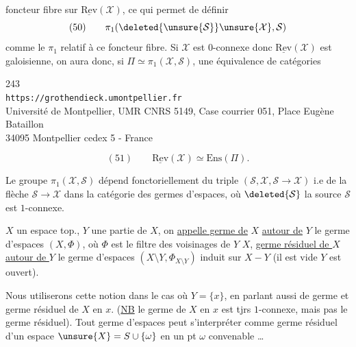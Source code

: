 foncteur fibre sur $\underline{\mathrm{Rev}}(\mathcal X)$, ce qui permet de définir
\[
(50)\qquad \pi_1(\deleted{\unsure{\mathcal S}}\unsure{\mathcal X},\mathcal S)
\]
comme le $\pi_1$ relatif à ce foncteur fibre. Si $\mathcal X$ est $0$-connexe donc $\underline{\mathrm{Rev}}(\mathcal X)$ est galoisienne, on aura donc, si $\Pi\simeq\pi_1(\mathcal X,\mathcal S)$, une équivalence de catégories


\begin{center}
243\\
\texttt{https://grothendieck.umontpellier.fr}\\
Université de Montpellier, UMR CNRS 5149, Case courrier 051, Place Eugène Bataillon\\
34095 Montpellier cedex 5 - France
\end{center}


\[
(51)\qquad \underline{\mathrm{Rev}}(\mathcal X)\simeq\mathrm{Ens}(\Pi).
\]

Le groupe $\pi_1(\mathcal X,\mathcal S)$ dépend fonctoriellement du triple $(\mathcal S,\mathcal X,\mathcal S\longrightarrow\mathcal X)$ i.e de la flèche $\mathcal S\longrightarrow\mathcal X$ dans la catégorie des germes d'espaces, où $\deleted{\mathcal S}$ la source $\mathcal S$ est $1$-connexe.

 $X$ un espace top., $Y$ une partie de $X$, on \uline{appelle germe de} $X$ \uline{autour de} $Y$ le germe d'espaces $(X,\Phi)$, où $\Phi$ est le filtre des voisinages de $Y$  $X$, \uline{germe résiduel de $X$ autour de $Y$} le germe d'espaces $(X\setminus Y,\Phi_{X\setminus Y})$ induit sur $X-Y$ (il est vide  $Y$ est ouvert).


Nous utiliserons cette notion  dans le cas où $Y=\{x\}$, en parlant aussi de germe et germe résiduel de $X$ en $x$. (\uline{NB} le germe de $X$ en $x$ est tjrs  $1$-connexe, mais pas le germe résiduel). Tout germe d'espaces  peut s'interpréter comme germe résiduel d'un espace  $\unsure{X}=S\cup\{\omega\}$ en un pt $\omega$ convenable \ldots


